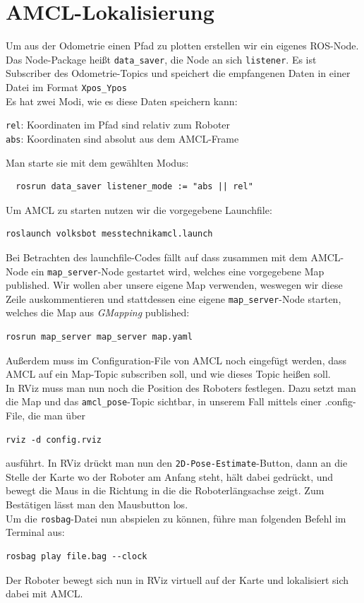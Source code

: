 \documentclass[11pt,a4paper]{article}
\begin{document}
\section{AMCL-Lokalisierung}
Um aus der Odometrie einen Pfad zu plotten erstellen wir ein eigenes ROS-Node. Das Node-Package heißt \verb|data_saver|, 
die Node an sich \texttt{listener}. Es ist Subscriber des Odometrie-Topics und speichert die empfangenen Daten 
in einer Datei im Format \verb|Xpos_Ypos| \\
Es hat zwei Modi, wie es diese Daten speichern kann:
\begin{center}
\texttt{rel}: Koordinaten im Pfad sind relativ zum Roboter \\
\texttt{abs}: Koordinaten sind absolut aus dem AMCL-Frame \\
\end{center}
Man starte sie mit dem gewählten Modus:
\begin{verbatim}
  rosrun data_saver listener_mode := "abs || rel"
\end{verbatim}
Um AMCL zu starten nutzen wir die vorgegebene Launchfile:
\begin{verbatim}
roslaunch volksbot messtechnikamcl.launch
\end{verbatim}
Bei Betrachten des launchfile-Codes fällt auf dass zusammen mit dem AMCL-Node ein \verb|map_server|-Node gestartet
wird, welches eine vorgegebene Map published. Wir wollen aber unsere eigene Map verwenden, weswegen wir diese Zeile
auskommentieren und stattdessen eine eigene \verb|map_server|-Node starten, welches die Map aus \textit{GMapping}
published: \begin{verbatim}
rosrun map_server map_server map.yaml
\end{verbatim}
Außerdem muss im Configuration-File von AMCL noch eingefügt werden, dass AMCL auf ein Map-Topic subscriben soll,
und wie dieses Topic heißen soll. \\
In RViz muss man nun noch die Position des Roboters festlegen. Dazu setzt man die Map und das \verb|amcl_pose|-Topic
sichtbar, in unserem Fall mittels einer .config-File, die man über \begin{verbatim}
rviz -d config.rviz
\end{verbatim}
ausführt.
In RViz drückt man nun den \verb|2D-Pose-Estimate|-Button, dann an die Stelle der Karte wo der Roboter am Anfang steht,
hält dabei gedrückt, und bewegt die Maus in die Richtung in die die Roboterlängsachse zeigt. Zum Bestätigen
lässt man den Mausbutton los. \\
Um die \texttt{rosbag}-Datei nun abspielen zu können, führe man folgenden Befehl im Terminal aus:
\begin{verbatim}
rosbag play file.bag --clock
\end{verbatim}
Der Roboter bewegt sich nun in RViz virtuell auf der Karte und lokalisiert sich dabei mit AMCL.
\end{document}
